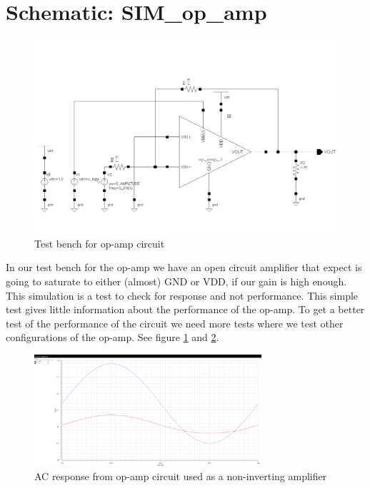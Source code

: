 \documentclass[english, a4paper,11pt]{article}
\begin{document}
\section*{Schematic: SIM\_op\_amp}
\begin{figure}[!ht]
 \centering
   \includegraphics[width=\textwidth]{img/SIM_op_amp_3.png}
   \caption{Test bench for op-amp circuit}
   \label{sim:opamp}
\end{figure}
In our test bench for the op-amp we have an open circuit amplifier that expect is going to saturate to either (almost) GND or VDD, if our gain is high enough.
This simulation is a test to check for response and not performance.
This simple test gives little information about the performance of the op-amp. 
To get a better test of the performance of the circuit we need more tests where we test other configurations of the op-amp. 
See figure \ref{sim:opamp} and \ref{sim:opamp_ac_responce_and_bode_plot}.

\begin{figure}[!ht]
 \centering
   \includegraphics[width=0.75\textwidth]{img/ac_responce_and_bode_plot.png}
   \caption{AC response from op-amp circuit used as a non-inverting amplifier}
   \label{sim:opamp_ac_responce_and_bode_plot}
\end{figure}


\printbibliography{}
\end{document}
